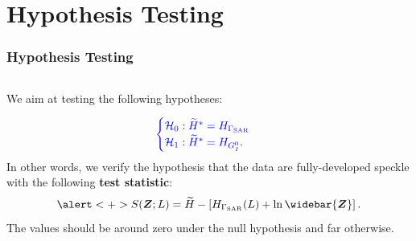 \documentclass[aspectratio=1610,10pt]{beamer}
\begin{document}
\section{Hypothesis Testing}
\begin{frame} \frametitle{\large{Hypothesis Testing }}\vspace{0.1cm}

 \justifying
\begin{columns}[T,onlytextwidth]
    \begin{column}{.45\textwidth}
			\begin{block}{}\justifying
 We aim at testing the following hypotheses:

\[\textcolor[rgb]{0,0,1}{
 \begin{cases}\mathcal{H}_0: \widetilde{H}^*= H_{\Gamma_{\text{SAR}}}\\ 
  \mathcal{H}_1:\widetilde{H}^*= H_{G_I^0}.\end{cases}}
\] In other words, we verify the hypothesis that the data are
fully-developed speckle with the following \textbf{test statistic}:
\pause
\begin{equation*}
\alert<+>{S(\bm{Z};L)= \widetilde{H}-\left[H_{\Gamma_{\text{SAR}}}(L)+\ln \widebar{\bm{Z}}\right].}
\end{equation*} The values should be around zero under the null
hypothesis and far otherwise.
		\end{block}
    \end{column}
		

\end{columns}
\end{frame}
\end{document}
